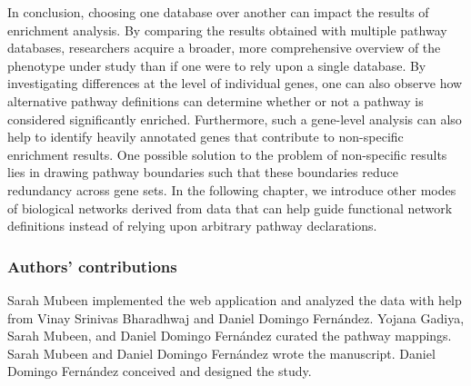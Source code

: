In conclusion, choosing one database over another can impact the results of enrichment analysis. By comparing the results obtained with multiple pathway databases, researchers acquire a broader, more comprehensive overview of the phenotype under study than if one were to rely upon a single database. By investigating differences at the level of individual genes, one can also observe how alternative pathway definitions can determine whether or not a pathway is considered significantly enriched. Furthermore, such a gene-level analysis can also help to identify heavily annotated genes that contribute to non-specific enrichment results. One possible solution to the problem of non-specific results lies in drawing pathway boundaries such that these boundaries reduce redundancy across gene sets. In the following chapter, we introduce other modes of biological networks derived from data that can help guide functional network definitions instead of relying upon arbitrary pathway declarations. 


\subsubsection{Authors' contributions}

Sarah Mubeen implemented the web application and analyzed the data with help from Vinay Srinivas Bharadhwaj and Daniel Domingo Fernández. Yojana Gadiya, Sarah Mubeen, and Daniel Domingo Fernández curated the pathway mappings. Sarah Mubeen and Daniel Domingo Fernández wrote the manuscript. Daniel Domingo Fernández conceived and designed the study. 

